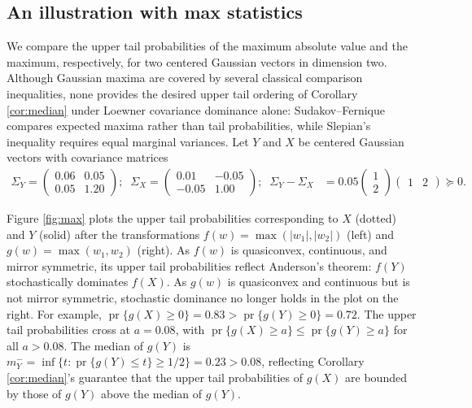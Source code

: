 \documentclass[11pt]{article}
\newcommand{\1}{\mathbbm{1}}
\def\pr{{\operatorname{pr}}}
\theoremstyle{plain}
\theoremstyle{definition}
\begin{document}
\subsection{An illustration with max statistics}\label{sec:illustration}


We compare the upper tail probabilities of the maximum absolute value and the maximum, respectively, for two centered Gaussian vectors in dimension two. Although Gaussian maxima are covered by several classical comparison inequalities, none provides the desired upper tail ordering of Corollary \ref{cor:median} under Loewner covariance dominance alone: Sudakov–Fernique compares expected maxima rather than tail probabilities, while Slepian’s inequality requires equal marginal variances. Let $Y$ and $X$ be centered Gaussian vectors with covariance matrices
\begin{align*}
\Sigma_Y = \begin{pmatrix}
   0.06  & 0.05 \\
    0.05  & 1.20
\end{pmatrix};\;\;
\Sigma_X =\begin{pmatrix}
   0.01  & -0.05 \\
    -0.05  & 1.00
  \end{pmatrix};\;\;
 \Sigma_Y-\Sigma_X &= 0.05\begin{pmatrix}1\\2\end{pmatrix}\begin{pmatrix}1 & 2\end{pmatrix}\succeq 0.\end{align*}



Figure \ref{fig:max} plots the upper tail probabilities corresponding to $X$ (dotted) and $Y$ (solid) after the transformations $f(w) = \max(|w_1|, |w_2|)$ (left) and $g(w)= \max(w_1,w_2)$ (right). As $f(w)$ is quasiconvex, continuous, and mirror symmetric, its upper tail probabilities reflect Anderson's theorem: $f(Y)$ stochastically dominates $f(X)$. As $g(w)$ is quasiconvex and continuous but is not mirror symmetric, stochastic dominance no longer holds in the plot on the right. For example,  $\pr\{g(X)\geq 0\} = 0.83 > \pr\{g(Y)\geq 0\} = 0.72$. The upper tail probabilities cross at $a=0.08$, with $\pr\{g(X)\geq a\} \leq \pr\{g(Y)\geq a\}$ for all $a>0.08$. The median of $g(Y)$ is $m^-_Y = \inf\{t:\pr\{g(Y)\leq t\} \geq 1/2\} = 0.23 > 0.08$, reflecting Corollary \ref{cor:median}'s guarantee that the upper tail probabilities of $g(X)$ are bounded by those of $g(Y)$ above the median of $g(Y)$. 
\end{document}
